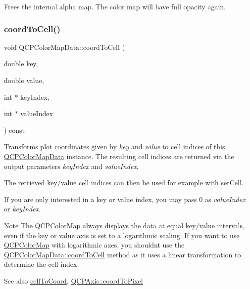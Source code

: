 Frees the internal alpha map. The color map will have full opacity again. \mbox{\label{classQCPColorMapData_aca5b29e0ca2f299c9060fc6e1f74d0c8}} 
\subsubsection{\texorpdfstring{coord\+To\+Cell()}{coordToCell()}}
{\footnotesize\ttfamily void Q\+C\+P\+Color\+Map\+Data\+::coord\+To\+Cell (\begin{DoxyParamCaption}\item[{double}]{key,  }\item[{double}]{value,  }\item[{int $\ast$}]{key\+Index,  }\item[{int $\ast$}]{value\+Index }\end{DoxyParamCaption}) const}

Transforms plot coordinates given by {\itshape key} and {\itshape value} to cell indices of this \hyperlink{classQCPColorMapData}{Q\+C\+P\+Color\+Map\+Data} instance. The resulting cell indices are returned via the output parameters {\itshape key\+Index} and {\itshape value\+Index}.

The retrieved key/value cell indices can then be used for example with \hyperlink{classQCPColorMapData_a8e75eaf8746596319032a93f3d2d0683}{set\+Cell}.

If you are only interested in a key or value index, you may pass 0 as {\itshape value\+Index} or {\itshape key\+Index}.

\begin{DoxyNote}{Note}
The \hyperlink{classQCPColorMap}{Q\+C\+P\+Color\+Map} always displays the data at equal key/value intervals, even if the key or value axis is set to a logarithmic scaling. If you want to use \hyperlink{classQCPColorMap}{Q\+C\+P\+Color\+Map} with logarithmic axes, you shouldn\textquotesingle{}t use the \hyperlink{classQCPColorMapData_aca5b29e0ca2f299c9060fc6e1f74d0c8}{Q\+C\+P\+Color\+Map\+Data\+::coord\+To\+Cell} method as it uses a linear transformation to determine the cell index.
\end{DoxyNote}
\begin{DoxySeeAlso}{See also}
\hyperlink{classQCPColorMapData_af1a36385c78ab624cd617065602408b6}{cell\+To\+Coord}, \hyperlink{classQCPAxis_af15d1b3a7f7e9b53d759d3ccff1fe4b4}{Q\+C\+P\+Axis\+::coord\+To\+Pixel} 
\end{DoxySeeAlso}
\mbox{\label{classQCPColorMapData_a350f783260eb9b5de5c7b5e0d5d3e3c2}} 
